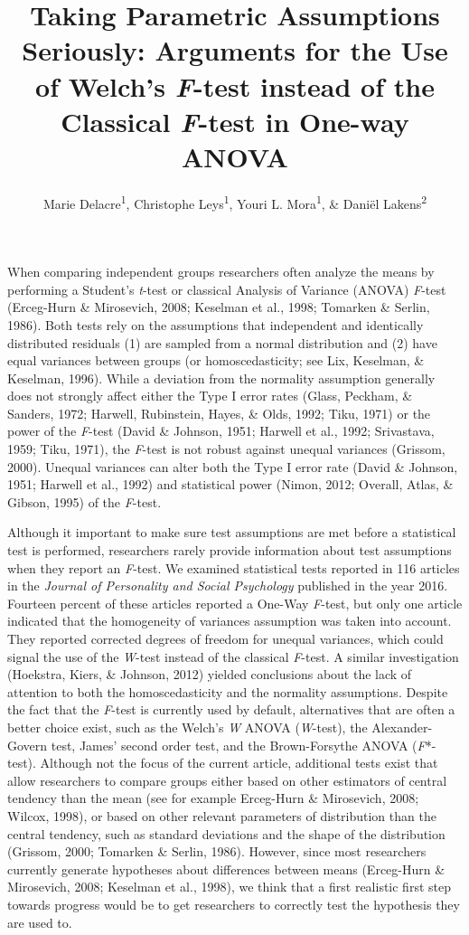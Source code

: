 \documentclass[man,floatsintext]{apa6}
\title{Taking Parametric Assumptions Seriously: Arguments for the Use of Welch's \emph{F}-test instead of the Classical \emph{F}-test in One-way ANOVA}
\author{Marie Delacre\textsuperscript{1}, Christophe Leys\textsuperscript{1}, Youri L. Mora\textsuperscript{1}, \& Daniël Lakens\textsuperscript{2}}
\date{}
\affiliation{
\vspace{0.5cm}
\textsuperscript{1} Université Libre de Bruxelles, Service of Analysis of the Data (SAD), Bruxelles, Belgium\\\textsuperscript{2} Eindhoven University of Technology, Human Technology Interaction Group, Eindhoven, the Netherlands }
\begin{document}
\maketitle

When comparing independent groups researchers often analyze the means by performing a Student's \emph{t}-test or classical Analysis of Variance (ANOVA) \emph{F}-test (Erceg-Hurn \& Mirosevich, 2008; Keselman et al., 1998; Tomarken \& Serlin, 1986). Both tests rely on the assumptions that independent and identically distributed residuals (1) are sampled from a normal distribution and (2) have equal variances between groups (or homoscedasticity; see Lix, Keselman, \& Keselman, 1996). While a deviation from the normality assumption generally does not strongly affect either the Type I error rates (Glass, Peckham, \& Sanders, 1972; Harwell, Rubinstein, Hayes, \& Olds, 1992; Tiku, 1971) or the power of the \emph{F}-test (David \& Johnson, 1951; Harwell et al., 1992; Srivastava, 1959; Tiku, 1971), the \emph{F}-test is not robust against unequal variances (Grissom, 2000). Unequal variances can alter both the Type I error rate (David \& Johnson, 1951; Harwell et al., 1992) and statistical power (Nimon, 2012; Overall, Atlas, \& Gibson, 1995) of the \emph{F}-test.

Although it important to make sure test assumptions are met before a statistical test is performed, researchers rarely provide information about test assumptions when they report an \emph{F}-test. We examined statistical tests reported in 116 articles in the \emph{Journal of Personality and Social Psychology} published in the year 2016. Fourteen percent of these articles reported a One-Way \emph{F}-test, but only one article indicated that the homogeneity of variances assumption was taken into account. They reported corrected degrees of freedom for unequal variances, which could signal the use of the \emph{W}-test instead of the classical \emph{F}-test. A similar investigation (Hoekstra, Kiers, \& Johnson, 2012) yielded conclusions about the lack of attention to both the homoscedasticity and the normality assumptions. Despite the fact that the \emph{F}-test is currently used by default, alternatives that are often a better choice exist, such as the Welch's \emph{W} ANOVA (\emph{W}-test), the Alexander-Govern test, James' second order test, and the Brown-Forsythe ANOVA (\emph{F}*-test). Although not the focus of the current article, additional tests exist that allow researchers to compare groups either based on other estimators of central tendency than the mean (see for example Erceg-Hurn \& Mirosevich, 2008; Wilcox, 1998), or based on other relevant parameters of distribution than the central tendency, such as standard deviations and the shape of the distribution (Grissom, 2000; Tomarken \& Serlin, 1986). However, since most researchers currently generate hypotheses about differences between means (Erceg-Hurn \& Mirosevich, 2008; Keselman et al., 1998), we think that a first realistic first step towards progress would be to get researchers to correctly test the hypothesis they are used to.
\end{document}
